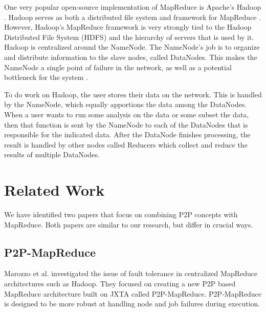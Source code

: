 \documentclass[10pt, conference, compsocconf]{IEEEtran}
\begin{document}
 

One very popular open-source implementation of MapReduce is Apache's Hadoop \cite{Hadoop}.  Hadoop serves as both a distributed file system and framework for MapReduce \cite{shvachko2010hadoop}.  However,  Hadoop's MapReduce framework is very strongly tied to the Hadoop Distributed File System (HDFS) and the hierarchy of servers that is used by it.  Hadoop is centralized around the NameNode.  The NameNode's job is to organize and distribute information to the slave nodes, called DataNodes.  This makes the NameNode a single point of failure \cite{shvachko2010hadoop} in the network, as well as a potential bottleneck for the system \cite{hadoop-bottle}.

To do work on Hadoop, the user stores their data on the network.  This is handled by the NameNode, which equally apportions the data among the DataNodes.  When a user wants to run some analysis on the data or some subset the data, then that function is sent by the NameNode to each of the DataNodes that is responsible for the indicated data.   After the DataNode finishes processing, the result is handled by other nodes called Reducers which collect and reduce the results of multiple DataNodes.




\section{Related Work}

We have identified two papers that focus on combining P2P concepts with MapReduce.  Both papers are similar to our research, but differ in crucial ways.


\subsection{P2P-MapReduce}
Marozzo et al. \cite{marozzo2012p2p} investigated the issue of fault tolerance in centralized MapReduce architectures such as Hadoop.  They focused on creating a new P2P based MapReduce architecture built on JXTA \cite{935182} called P2P-MapReduce.  P2P-MapReduce is designed to be more robust at handling node and job failures during execution.
\end{document}
